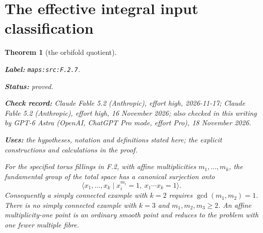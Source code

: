 \documentclass[11pt,a4paper]{article}
\newtheorem{theorem}{Theorem}[section]
\theoremstyle{definition}
\newcommand{\StatementRecord}[4]{\par\smallskip\begingroup\upshape\raggedright\noindent\textbf{Label:} \nolinkurl{#1}.\par\noindent\textbf{Status:} #2.\par\noindent\textbf{Check record:} #3.\par\noindent\textbf{Uses:} #4.\par\endgroup\smallskip}
\newcommand{\CurrentChecker}{GPT-6 Astra (OpenAI, ChatGPT Pro mode, effort Pro), 18 November 2026}
\begin{document}
\section{The effective integral input classification}



\begin{theorem}[the orbifold quotient]\label{maps:src:F.2.7}
\StatementRecord{maps:src:F.2.7}{proved}{Claude Fable 5.2 (Anthropic), effort high, 2026-11-17; Claude Fable 5.2 (Anthropic), effort high, 16 November 2026; also checked in this writing by \CurrentChecker}{the hypotheses, notation and definitions stated here; the explicit constructions and calculations in the proof}


For the specified torus fillings in F.2, with affine
multiplicities $m_1,\ldots,m_k$, the fundamental group of the
total space has a canonical surjection onto
\[
 \langle x_1,\ldots,x_k\mid
       x_i^{m_i}=1,\ x_1\cdots x_k=1\rangle.
 \tag{F.27}\label{maps:eq:F.27}
\]
Consequently a simply connected example with $k=2$ requires
$\gcd(m_1,m_2)=1$.  There is no simply connected example with
$k=3$ and $m_1,m_2,m_3\geq2$.  An affine multiplicity-one
point is an ordinary smooth point and reduces to the problem
with one fewer multiple fibre.

\end{theorem}
\end{document}
